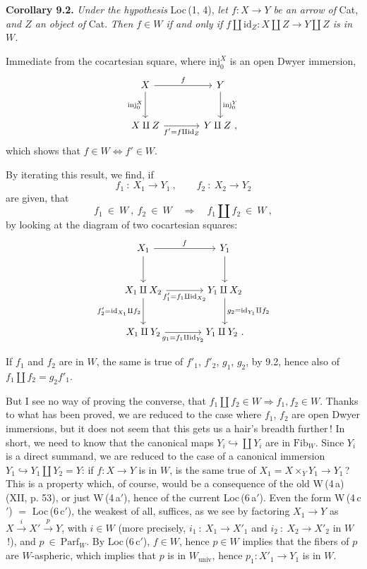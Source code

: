 \documentclass[11pt]{article}
\newcommand{\printedpage}[1]{\marginpar{\footnotesize p.~#1}}
\newcommand{\msp}[1]{\marginpar{\footnotesize [#1]}}
\newcommand{\id}{\mathrm{id}}
\newcommand{\inj}{\mathrm{inj}}
\newcommand{\Fib}{\mathrm{Fib}}
\begin{document}
\msp{page 120}

\textbf{Corollary 9.2.} \textit{Under the hypothesis} Loc\,(1, 4), \textit{let $f : X\longrightarrow Y$ be an arrow of} Cat, \textit{and $Z$ an object of} Cat. \textit{Then $f\in W$ if and only if $f\amalg\id_Z : X\amalg Z\longrightarrow Y\amalg Z$ is in $W$.}

Immediate from the cocartesian square, where $\inj_0^X$ is an open Dwyer immersion,
\[
\begin{tikzcd}[column sep=large, row sep=large]
X \arrow[r, "f"] \arrow[d, "\inj_0^X"'] & Y \arrow[d, "\inj_0^Y"] \\
X\amalg Z \arrow[r, "f'=f\amalg\id_Z"'] & Y\amalg Z\ ,
\end{tikzcd}
\]
which shows that $f\in W\iff f'\in W$.

By iterating this result, we find, if
\[
f_1\ :\ X_1\longrightarrow Y_1\ ,\qquad f_2\ :\ X_2\longrightarrow Y_2
\]
are given, that
\[
f_1\ \in\ W\ ,\ f_2\ \in\ W\quad\Longrightarrow\quad f_1\amalg f_2\ \in\ W\ ,
\]
by looking at the diagram of two cocartesian squares:
\[
\begin{tikzcd}[column sep=large, row sep=large]
X_1 \arrow[r, "f"] \arrow[d] & Y_1 \arrow[d] \\ %
X_1\amalg X_2 \arrow[r, "f'_1=f_1\amalg\id_{X_2}"'] \arrow[d, "f'_2=\id_{X_1}\amalg f_2"'] & Y_1\amalg X_2 \arrow[d, "g_2=\id_{Y_1}\amalg f_2"] \\
X_1\amalg Y_2 \arrow[r, "g_1=f_1\amalg\id_{Y_2}"'] & Y_1\amalg Y_2\ .
\end{tikzcd}
\]

\printedpage{66}

If $f_1$ and $f_2$ are in $W$, the same is true of $f'_1$, $f'_2$, $g_1$, $g_2$, by 9.2, hence also of $f_1\amalg f_2=g_2f'_1$.

\msp{page 121}

But I see no way of proving the converse, that $f_1\amalg f_2\in W\Longrightarrow f_1,f_2\in W$. Thanks to what has been proved, we are reduced to the case where $f_1$, $f_2$ are open Dwyer immersions, but it does not seem that this gets us a hair's breadth further\,! In short, we need to know that the canonical maps $Y_i\hookrightarrow\coprod Y_i$ are in $\Fib_W$. Since $Y_i$ is a direct summand, we are reduced to the case of a canonical immersion $Y_1\hookrightarrow Y_1\amalg Y_2=Y$: if $f : X\longrightarrow Y$ is in $W$, is the same true of $X_1=X\times_Y Y_1\longrightarrow Y_1$\,? This is a property which, of course, would be a consequence of the old W\,(4\,a) (XII, p. 53), or just W\,(4\,a$'$), hence of the current Loc\,(6\,a$'$). Even the form W\,(4\,c$'$) $=$ Loc\,(6\,c$'$), the weakest of all, suffices, as we see by factoring $X_1\longrightarrow Y$ as $X\xrightarrow{\ i\ }X'\xrightarrow{\ p\ }Y$, with $i\in W$ (more precisely, $i_1\ :\ X_1\longrightarrow X'_1$ and $i_2\ :\ X_2\longrightarrow X'_2$ in $W$\,!), and $p\ \in\ \mathrm{Parf}_W$. By Loc\,(6\,c$'$), $f\in W$, hence $p\in W$ implies that the fibers of $p$ are $W$-aspheric, which implies that $p$ is in $W_{\mathrm{univ}}$, hence $p_1 : X'_1\longrightarrow Y_1$ is in $W$.
\end{document}
